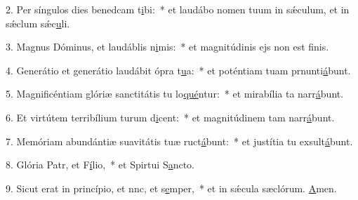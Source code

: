 2. Per síngulos dies benedcam t\uline{i}bi:~* et laudábo nomen tuum in sǽculum, et in sǽclum sǽc\uline{u}li.\par 
3. Magnus Dóminus, et laudáblis n\uline{i}mis:~* et magnitúdinis ejs non est f\uline{i}nis.\par 
4. Generátio et generátio laudábit ópra t\uline{u}a:~* et poténtiam tuam prnunti\uline{á}bunt.\par 
5. Magnificéntiam glóriæ sanctitátis tu lo\uline{qué}ntur:~* et mirabília ta narr\uline{á}bunt.\par 
6. Et virtútem terribílium turum d\uline{i}cent:~* et magnitúdinem tam narr\uline{á}bunt.\par 
7. Memóriam abundántiæ suavitátis tuæ ruct\uline{á}bunt:~* et justítia tu exsult\uline{á}bunt.\par 
8. Glória Patr, et F\uline{í}lio,~* et Spirtui S\uline{a}ncto.\par 
9. Sicut erat in princípio, et nnc, et s\uline{e}mper,~* et in sǽcula sæclórum. \uline{A}men.\par 
